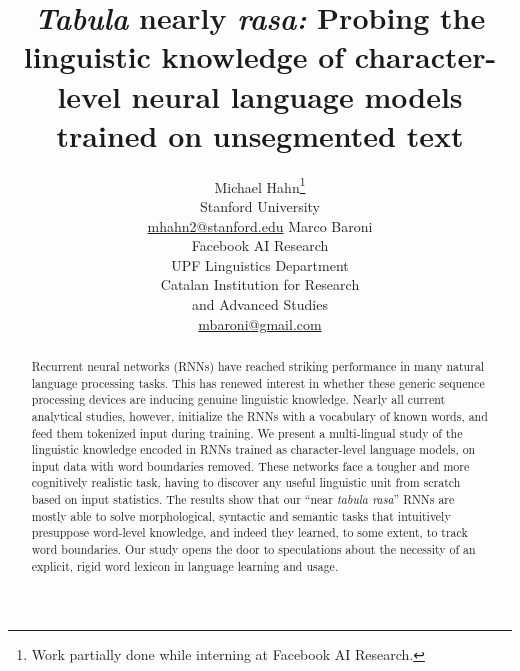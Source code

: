 

\title{\emph{Tabula} nearly \emph{rasa:} Probing the linguistic knowledge of character-level neural language models trained on unsegmented text}


%


\author{Michael Hahn\thanks{Work partially done while interning at Facebook AI Research.} \\ Stanford University \\ \url{mhahn2@stanford.edu} \And Marco Baroni \\ Facebook AI Research \\ UPF Linguistics Department \\ Catalan Institution for Research\\and Advanced Studies \\ \url{mbaroni@gmail.com}}


\date{}

\hypersetup{draft}


\maketitle
\begin{abstract}
  Recurrent neural networks (RNNs) have reached striking performance in
  many natural language processing tasks. This has renewed interest in
  whether these generic sequence processing devices are inducing
  genuine linguistic knowledge. Nearly all current analytical studies,
  however, initialize the RNNs with a vocabulary of known words, and
  feed them tokenized input during training. We present a
  multi-lingual study of the linguistic knowledge encoded in RNNs
  trained as character-level language models, on input data with word
  boundaries removed. These networks face a tougher and more
  cognitively realistic task, having to discover any useful
  linguistic unit from scratch based on input statistics. The results
  show that our ``near \emph{tabula rasa}'' RNNs are mostly able to
  solve morphological, syntactic and semantic tasks that intuitively
  presuppose word-level knowledge, and indeed they learned, to some extent, to track
   word boundaries. Our study opens the door to speculations
  about the necessity of an explicit, rigid word lexicon in language learning and
  usage.
\end{abstract}


